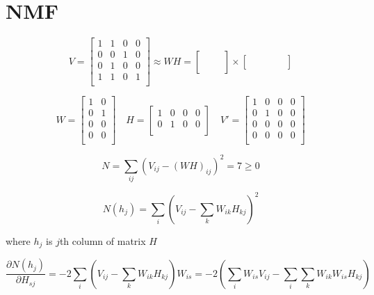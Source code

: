 \documentclass{extreport}
\begin{document}
\section{NMF}

\[
  V =
  \begin{bmatrix}
    1 & 1 & 0 & 0 \\
    0 & 0 & 1 & 0 \\
    0 & 1 & 0 & 0 \\
    1 & 1 & 0 & 1 \\
  \end{bmatrix}
  \approx WH =
  \begin{bmatrix}
    & & \\
    & & \\
    & & \\
    & & \\
  \end{bmatrix}
  \times
  \begin{bmatrix}
    & & & & \\
    & & & & \\
  \end{bmatrix}
\]

\[
  W =
  \begin{bmatrix}
    1 & 0 \\
    0 & 1 \\
    0 & 0 \\
    0 & 0 \\
  \end{bmatrix} \quad
  H =
  \begin{bmatrix}
    1 & 0 & 0 & 0 \\
    0 & 1 & 0 & 0 \\
  \end{bmatrix} \quad
  V' =
  \begin{bmatrix}
    1 & 0 & 0 & 0 \\
    0 & 1 & 0 & 0 \\
    0 & 0 & 0 & 0 \\
    0 & 0 & 0 & 0 \\
  \end{bmatrix}
\]

\[
  N = \sum_{ij}
  \left(
    V_{ij} - (WH)_{ij}
  \right)^2
  = 7 \geqslant 0
\]

\[
  N(h_j) = \sum_{i}
  \left(
    V_{ij} - \sum_{k}W_{ik}H_{kj}
  \right)^2
\]

where $h_j$ is $j$th column of matrix $H$

\[
  \frac{\partial N(h_j)}{\partial H_{sj}} =
  -2 \sum_i
    \left(
      V_{ij} - \sum_k W_{ik}H_{kj}
    \right)
  W_{is} =
  -2
    \left(
      \sum_i W_{is}V_{ij} - \sum_i\sum_kW_{ik}W_{is}H_{kj}
    \right)
\]
\end{document}
